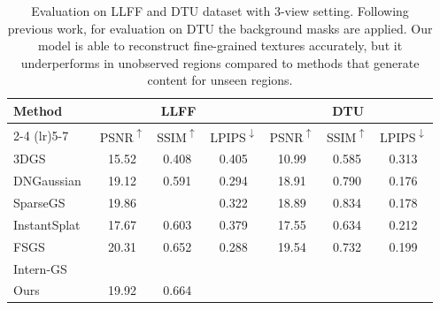 \begin{table}[ht!]
    \centering
    \footnotesize
    \setlength{\tabcolsep}{2pt}
    \begin{tabular}{lcccccc}
    \toprule
    \multirow{3}{*}{Method} & \multicolumn{3}{c}{LLFF} & \multicolumn{3}{c}{DTU}\\
    \cmidrule(lr){2-4} \cmidrule(lr){5-7}
    & PSNR\textsuperscript{$\uparrow$} & SSIM\textsuperscript{$\uparrow$} & LPIPS\textsuperscript{$\downarrow$}& PSNR\textsuperscript{$\uparrow$} & SSIM\textsuperscript{$\uparrow$} & LPIPS\textsuperscript{$\downarrow$}\\
    \midrule
 3DGS~\cite{3dgs2023} & 15.52 & 0.408 & 0.405&10.99 & 0.585 & 0.313 \\ 
 DNGaussian~\cite{DNGaussian} & 19.12 & 0.591 & \cellcolor{tab_color!10}0.294&\cellcolor{tab_color!10}18.91 & 0.790 & \cellcolor{tab_color!10}0.176 \\ 
 SparseGS~\cite{SparseGS} & 19.86 & \cellcolor{tab_color!30}{0.668} & 0.322& 18.89 & \cellcolor{tab_color!30}0.834 & 0.178 \\ 
 InstantSplat~\cite{InstantSplat} & 17.67 & 0.603 & 0.379&17.55 & 0.634 & 0.212 \\ 
 FSGS~\cite{fsgs}&\cellcolor{tab_color!30}20.31& 0.652&0.288&19.54& 0.732&0.199\\
 Intern-GS~\cite{InternGS} & \cellcolor{tab_color!50}{20.49} &  \cellcolor{tab_color!50}{0.693} & \cellcolor{tab_color!50}{0.212}&\cellcolor{tab_color!30}{20.34} & \cellcolor{tab_color!50}{0.851} & \cellcolor{tab_color!30}{0.163} \\ 
 Ours & \cellcolor{tab_color!10}19.92 & \cellcolor{tab_color!10}0.664 & \cellcolor{tab_color!30}{0.254}&\cellcolor{tab_color!50}{23.52} & \cellcolor{tab_color!10}{0.815} & \cellcolor{tab_color!50}{0.145}\\
    \bottomrule
    \end{tabular}
    \caption{Evaluation on LLFF and DTU dataset with 3-view setting. Following previous work, for evaluation on DTU the background masks are applied. Our model is able to reconstruct fine-grained textures accurately, but it underperforms in unobserved regions compared to methods that generate content for unseen regions.}
    \label{tab:llff_dtu_comparison}
\end{table}